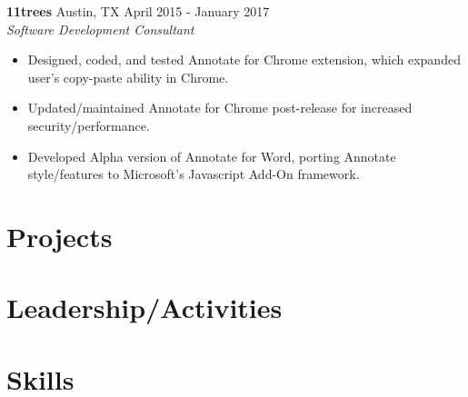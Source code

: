 \documentclass[10pt]{article}
\begin{document}
    \textbf{11trees}
    \hfill
    Austin, TX
    \hfill
    April 2015 - January 2017
    \\
    \textit{Software Development Consultant}
    \begin{itemize}
      \item Designed, coded, and tested Annotate for Chrome extension, which expanded user's copy-paste ability in Chrome.
      \item Updated/maintained Annotate for Chrome post-release for increased security/performance.
      \item Developed Alpha version of Annotate for Word, porting Annotate style/features to Microsoft's Javascript Add-On framework.
    \end{itemize}
 

  \section*{Projects}

  \section*{Leadership/Activities}

  \section*{Skills}
\end{document}
